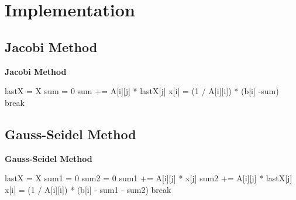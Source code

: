\documentclass{article}
\begin{document}
\section{Implementation}
\subsection{Jacobi Method}
\begin{algorithm}[H]
    \caption{\textbf{Jacobi Method}}
    \label{algo:jacobi}
    \begin{algorithmic}
            \State lastX = X
                \State sum = 0
                        \State sum += A[i][j] * lastX[j]
                    \EndIf
                \EndFor
                \State x[i] = (1 / A[i][i]) * (b[i] -sum)
            \EndFor
                \State break
            \EndIf
        \EndFor
    \end{algorithmic}
\end{algorithm}

\subsection{Gauss-Seidel Method}
\begin{algorithm}[H]
    \caption{\textbf{Gauss-Seidel Method}}
    \label{algo:gaussSeidel}
    \begin{algorithmic}
            \State lastX = X
                \State sum1 = 0
                \State sum2 = 0
                    \State sum1 += A[i][j] * x[j]
                \EndFor
                    \State sum2 += A[i][j] * lastX[j]
                \EndFor
                \State x[i] = (1 / A[i][i]) * (b[i] - sum1 - sum2)
            \EndFor
                \State break
            \EndIf
        \EndFor
    \end{algorithmic}
\end{algorithm}
\end{document}
